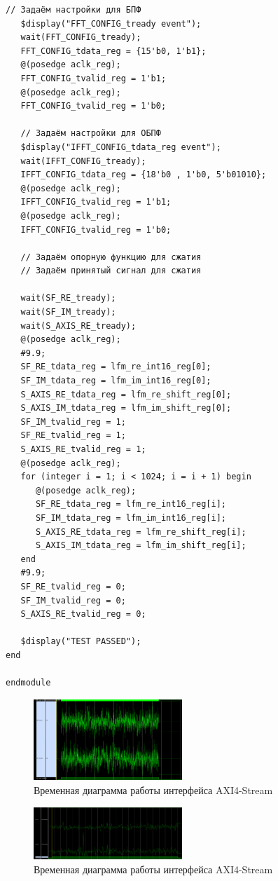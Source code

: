 \begin{Verbatim}[tabsize=4]
   // Задаём настройки для БПФ
   $display("FFT_CONFIG_tready event");
   wait(FFT_CONFIG_tready);
   FFT_CONFIG_tdata_reg = {15'b0, 1'b1};
   @(posedge aclk_reg);
   FFT_CONFIG_tvalid_reg = 1'b1;
   @(posedge aclk_reg);
   FFT_CONFIG_tvalid_reg = 1'b0;

   // Задаём настройки для ОБПФ
   $display("IFFT_CONFIG_tdata_reg event");
   wait(IFFT_CONFIG_tready);
   IFFT_CONFIG_tdata_reg = {18'b0 , 1'b0, 5'b01010};
   @(posedge aclk_reg);
   IFFT_CONFIG_tvalid_reg = 1'b1;
   @(posedge aclk_reg);
   IFFT_CONFIG_tvalid_reg = 1'b0;

   // Задаём опорную функцию для сжатия
   // Задаём принятый сигнал для сжатия

   wait(SF_RE_tready);
   wait(SF_IM_tready);
   wait(S_AXIS_RE_tready);
   @(posedge aclk_reg);
   #9.9;
   SF_RE_tdata_reg = lfm_re_int16_reg[0];
   SF_IM_tdata_reg = lfm_im_int16_reg[0];
   S_AXIS_RE_tdata_reg = lfm_re_shift_reg[0];
   S_AXIS_IM_tdata_reg = lfm_im_shift_reg[0]; 
   SF_IM_tvalid_reg = 1;
   SF_RE_tvalid_reg = 1;
   S_AXIS_RE_tvalid_reg = 1;
   @(posedge aclk_reg);
   for (integer i = 1; i < 1024; i = i + 1) begin
      @(posedge aclk_reg);
      SF_RE_tdata_reg = lfm_re_int16_reg[i];
      SF_IM_tdata_reg = lfm_im_int16_reg[i];
      S_AXIS_RE_tdata_reg = lfm_re_shift_reg[i];
      S_AXIS_IM_tdata_reg = lfm_im_shift_reg[i]; 
   end
   #9.9;   
   SF_RE_tvalid_reg = 0;
   SF_IM_tvalid_reg = 0;
   S_AXIS_RE_tvalid_reg = 0;

   $display("TEST PASSED");
end

endmodule
\end{Verbatim}

\begin{figure}[h]
	\centering
	\includegraphics[width=0.5\textwidth]{image/lfm_with_noise.png}
	\caption{Временная диаграмма работы интерфейса AXI4-Stream}
	\label{fft_result}
\end{figure}
	
\begin{figure}[h]
	\centering
	\includegraphics[width=0.5\textwidth]{image/correl_with_noise.png}
	\caption{Временная диаграмма работы интерфейса AXI4-Stream}
	\label{fft_detailed_implem}
\end{figure}

